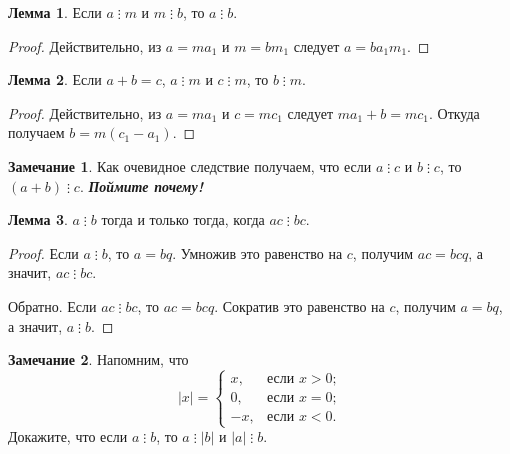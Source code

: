 \documentclass[14pt, a4paper]{extarticle}
\theoremstyle{definition}
\newtheorem{lemma}{Лемма}
\newtheorem*{remark}{Замечание}
\newcommand{\divisible}{\mathop{\vdots}}
\begin{document}
	\begin{lemma}
	\label{tran}
		Если $a\divisible m$ и $m\divisible b$, то $a\divisible b$.
	\end{lemma}
	\begin{proof}
		Действительно, из $a=ma_1$ и $m=bm_1$ следует $a=ba_1m_1$.
	\end{proof}

	\begin{lemma}
	\label{sum}
		Если $a+b=c$, $a\divisible m$ и $c\divisible m$, то $b\divisible m$.
	\end{lemma}
	\begin{proof}
		Действительно, из $a=ma_1$ и $c=mc_1$ следует $ma_1+b=mc_1$. Откуда получаем $b=m(c_1-a_1)$.
	\end{proof}

	\begin{remark}
		Как очевидное следствие получаем, что если $a\divisible c$ и $b\divisible c$, то $(a+b)\divisible c$. \textbf{\textit{Поймите почему!}}
	\end{remark}

	\begin{lemma}
	\label{sokr}
		$a\divisible b$ тогда и только тогда, когда $ac\divisible bc$.
	\end{lemma}
	\begin{proof}
		Если $a\divisible b$, то $a=bq$. Умножив это равенство на $c$, получим $ac=bcq$, а значит, $ac\divisible bc$.
		
		Обратно. Если $ac\divisible bc$, то $ac=bcq$. Сократив это равенство на $c$, получим $a=bq$, а значит, $a\divisible b$.
	\end{proof}

	\begin{remark}
		Напомним, что $$|x|=
		\begin{cases}
			x,&\text{если $x>0$;}\\
			0,&\text{если $x=0$;}\\
			-x,&\text{если $x<0$.}
		\end{cases}$$
		Докажите, что если $a\divisible b$, то $a\divisible|b|$ и $|a|\divisible b$.
	\end{remark}
\end{document}

